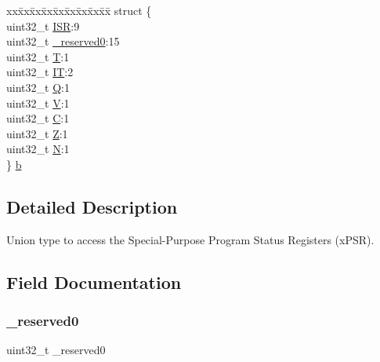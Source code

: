 \begin{DoxyCompactItemize}
\begin{tabbing}
\end{tabbing}\item 
\begin{tabbing}
xx\=xx\=xx\=xx\=xx\=xx\=xx\=xx\=xx\=\kill
struct \{\\
\>uint32\_t \hyperlink{unionx_p_s_r___type_ad502ba7dbb2aab5f87c782b28f02622d}{ISR}:9\\
\>uint32\_t \hyperlink{unionx_p_s_r___type_ac8a6a13838a897c8d0b8bc991bbaf7c1}{\_reserved0}:15\\
\>uint32\_t \hyperlink{unionx_p_s_r___type_a6e1cf12e53a20224f6f62c001d9be972}{T}:1\\
\>uint32\_t \hyperlink{unionx_p_s_r___type_a76485660fe8ad98cdc71ddd7cb0ed777}{IT}:2\\
\>uint32\_t \hyperlink{unionx_p_s_r___type_a65f27ddc4f7e09c14ce7c5211b2e000a}{Q}:1\\
\>uint32\_t \hyperlink{unionx_p_s_r___type_acd4a2b64faee91e4a9eef300667fa222}{V}:1\\
\>uint32\_t \hyperlink{unionx_p_s_r___type_a7a1caf92f32fe9ebd8d1fe89b06c7776}{C}:1\\
\>uint32\_t \hyperlink{unionx_p_s_r___type_a5ae954cbd9986cd64625d7fa00943c8e}{Z}:1\\
\>uint32\_t \hyperlink{unionx_p_s_r___type_abae0610bc2a97bbf7f689e953e0b451f}{N}:1\\
\} \hyperlink{unionx_p_s_r___type_a4ff200ad9067d3d0864a8465a92eb7d6}{b}\\

\end{tabbing}\end{DoxyCompactItemize}


\subsection{Detailed Description}
Union type to access the Special-\/\+Purpose Program Status Registers (x\+P\+SR). 

\subsection{Field Documentation}
\mbox{\label{unionx_p_s_r___type_ac8a6a13838a897c8d0b8bc991bbaf7c1}} 
\subsubsection{\texorpdfstring{\+\_\+reserved0}{\_reserved0}}
{\footnotesize\ttfamily uint32\+\_\+t \+\_\+reserved0}

